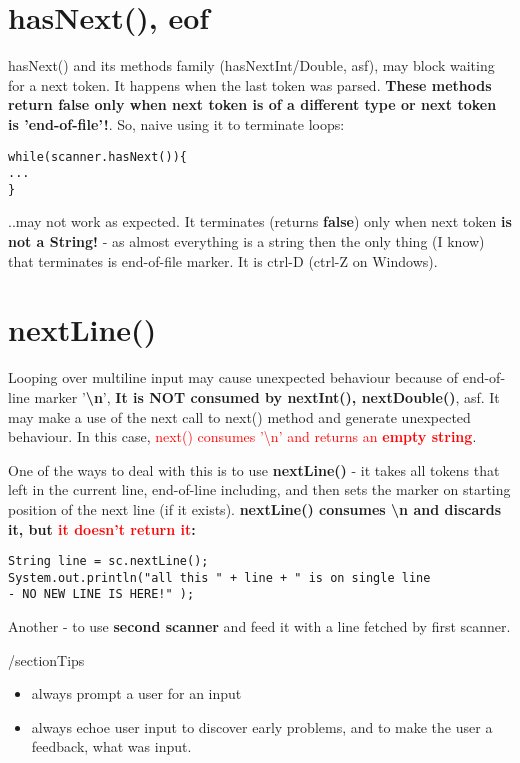 \documentclass{report}
\begin{document}
\section{hasNext(), eof}
hasNext() and its methods family (hasNextInt/Double, asf), may block waiting for a next token. It happens when the last token was parsed. \textbf{These methods return false only when next token is of a different type or next token is 'end-of-file'!}. So, naive using it to terminate loops:
\begin{verbatim}
while(scanner.hasNext()){
...
}
\end{verbatim}
..may not work as expected. It terminates (returns \textbf{false}) only when next token \textbf{is not a String!} - as almost everything is a string then the only thing (I know) that terminates is end-of-file marker. It is ctrl-D (ctrl-Z on Windows).

\section{nextLine()}
Looping over multiline input may cause unexpected behaviour because of end-of-line marker '\textbf{\textbackslash n}', \textbf{It is NOT consumed by nextInt(), nextDouble()}, asf. It may make a use of the next call to next() method and generate unexpected behaviour. In this case, \textcolor{red}{next() consumes '\textbackslash n' and returns an \textbf{empty string}}. \\
\par
One of the ways to deal with this is to use \textbf{nextLine()} - it takes all tokens that left in the current line, end-of-line including, and then sets the marker on starting position of the next line (if it exists). 
\textbf{nextLine() consumes \textbackslash n and discards it, but  \textcolor{red}{it doesn't return it}: }
\begin{verbatim}
String line = sc.nextLine();
System.out.println("all this " + line + " is on single line 
- NO NEW LINE IS HERE!" );
\end{verbatim}
Another - to use \textbf{second scanner} and feed it with a line fetched by first scanner. 

/section{Tips}
\begin{itemize}
	\item always prompt a user for an input
	\item always echoe user input to discover early problems, and to make the user a feedback, what was input.
\end{itemize}
\end{document}
